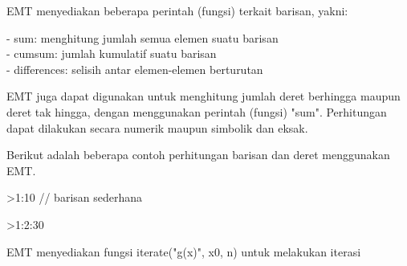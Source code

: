 \documentclass[a4paper,10pt]{article}
\begin{document}
\begin{eulernotebook}
\begin{eulercomment}
\begin{eulercomment}
\begin{eulercomment}
\begin{eulercomment}
\begin{eulercomment}
\begin{eulercomment}
\begin{eulercomment}
\begin{eulercomment}
\begin{eulercomment}
\begin{eulercomment}
\begin{eulercomment}
\begin{eulercomment}
\begin{eulercomment}
\begin{eulercomment}
\begin{eulercomment}
\begin{eulercomment}
\begin{eulercomment}
\begin{eulercomment}
\begin{eulercomment}
\begin{eulercomment}
\begin{eulercomment}
EMT menyediakan beberapa perintah (fungsi) terkait barisan, yakni:

- sum: menghitung jumlah semua elemen suatu barisan\\
- cumsum: jumlah kumulatif suatu barisan\\
- differences: selisih antar elemen-elemen berturutan

EMT juga dapat digunakan untuk menghitung jumlah deret berhingga maupun deret tak hingga,
dengan menggunakan perintah (fungsi) "sum". Perhitungan dapat dilakukan secara numerik
maupun simbolik dan eksak.

Berikut adalah beberapa contoh perhitungan barisan dan deret menggunakan EMT.
\end{eulercomment}
\begin{eulerprompt}
>1:10 // barisan sederhana
\end{eulerprompt}
\begin{euleroutput}
  [1,  2,  3,  4,  5,  6,  7,  8,  9,  10]
\end{euleroutput}
\begin{eulerprompt}
>1:2:30
\end{eulerprompt}
\begin{euleroutput}
  [1,  3,  5,  7,  9,  11,  13,  15,  17,  19,  21,  23,  25,  27,  29]
\end{euleroutput}
\begin{eulercomment}
EMT menyediakan fungsi iterate("g(x)", x0, n) untuk melakukan iterasi


\end{eulercomment}
\end{eulercomment}
\end{eulercomment}
\end{eulercomment}
\end{eulercomment}
\end{eulercomment}
\end{eulercomment}
\end{eulercomment}
\end{eulercomment}
\end{eulercomment}
\end{eulercomment}
\end{eulercomment}
\end{eulercomment}
\end{eulercomment}
\end{eulercomment}
\end{eulercomment}
\end{eulercomment}
\end{eulercomment}
\end{eulercomment}
\end{eulercomment}
\end{eulercomment}
\end{eulernotebook}
\end{document}
